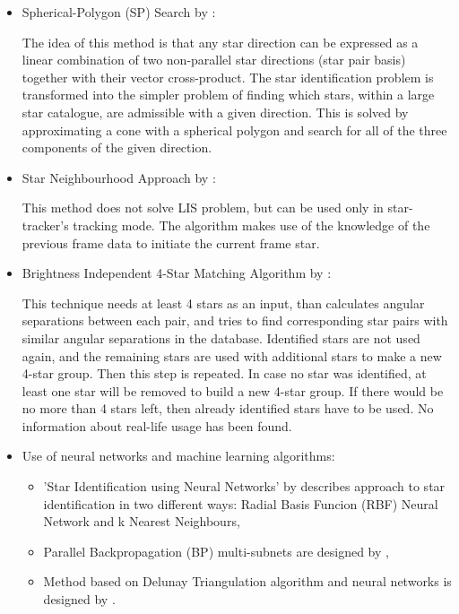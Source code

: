 \documentclass[12pt,a4paper,oneside]{article}
\begin{document}
\begin{itemize}
\item Spherical-Polygon (SP) Search by \citet{mortari1999sp}:

The idea of this method is that any star direction can be expressed as a linear combination of two non-parallel star directions (star pair basis) together with their vector cross-product. The star identification problem is transformed into the simpler problem of finding which stars, within a large star catalogue, are admissible with a given direction. This is solved by approximating a cone with a spherical polygon and search for all of the three components of the given direction. 

\item Star Neighbourhood Approach by \citet{samaan2005recursive}:

This method does not solve LIS problem, but can be used only in star-tracker's tracking mode. The algorithm makes use of the knowledge of the previous frame data to initiate the current frame star.


\item Brightness Independent 4-Star Matching Algorithm by \citet{dong2006brightness}:

This technique needs at least 4 stars as an input, than calculates angular separations between each pair, and tries to find corresponding star pairs with similar angular separations in the database.
Identified stars are not used again, and the remaining stars are used with additional stars to make a new 4-star group. Then this step is repeated. In case no star was identified, at least one star will be removed to build a new 4-star group. If there would be no more than 4 stars left, then already identified stars have to be used.
No information about real-life usage has been found.

\item Use of neural networks and machine learning algorithms:

\begin{itemize}
\item 'Star Identification using Neural Networks' by \citet{lindbladstar} describes approach to star identification in two different ways: Radial Basis Funcion (RBF) Neural Network and k Nearest Neighbours,

\item Parallel Backpropagation (BP) multi-subnets are designed by \citet{li2003star},

\item Method based on Delunay Triangulation algorithm and neural networks is designed by \citet{miri2012star}.

\end{itemize}
\end{itemize}
\end{document}
